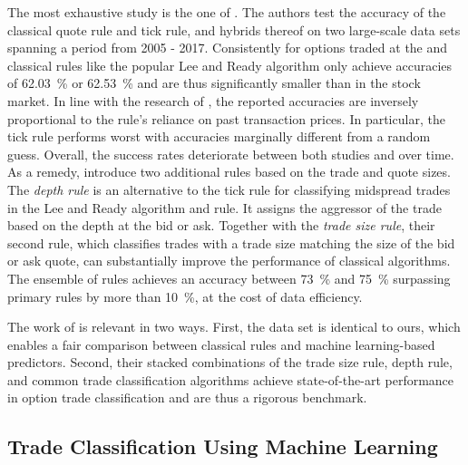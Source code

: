 The most exhaustive study is the one of \textcite[1--39]{grauerOptionTradeClassification2022}. The authors test the accuracy of the classical quote rule and tick rule, and hybrids thereof on two large-scale data sets spanning a period from 2005 - 2017. Consistently for options traded at the  and  classical rules like the popular Lee and Ready algorithm only achieve accuracies of \SI{62.03}{\percent} or \SI{62.53}{\percent} and are thus significantly smaller than in the stock market. In line with the research of \textcite[886]{savickasInferringDirectionOption2003}, the reported accuracies are inversely proportional to the rule's reliance on past transaction prices. In particular, the tick rule performs worst with accuracies marginally different from a random guess. Overall, the success rates deteriorate between both studies and over time. As a remedy, \textcite[14--17]{grauerOptionTradeClassification2022} introduce two additional rules based on the trade and quote sizes. The \emph{depth rule} is an alternative to the tick rule for classifying midspread trades in the Lee and Ready algorithm and  rule. It assigns the aggressor of the trade based on the depth at the bid or ask. Together with the \emph{trade size rule}, their second rule, which classifies trades with a trade size matching the size of the bid or ask quote, can substantially improve the performance of classical algorithms. The ensemble of rules achieves an accuracy between \SI{73}{\percent} and \SI{75}{\percent} surpassing primary rules by more than \SI{10}{\percent}, at the cost of data efficiency.

The work of \textcite[1--39]{grauerOptionTradeClassification2022} is relevant in two ways. First, the data set is identical to ours, which enables a fair comparison between classical rules and machine learning-based predictors. Second, their stacked combinations of the trade size rule, depth rule, and common trade classification algorithms achieve state-of-the-art performance in option trade classification and are thus a rigorous benchmark.

\subsection{Trade Classification Using Machine Learning}
\label{sec:trade-classification-using-machine-learning}

